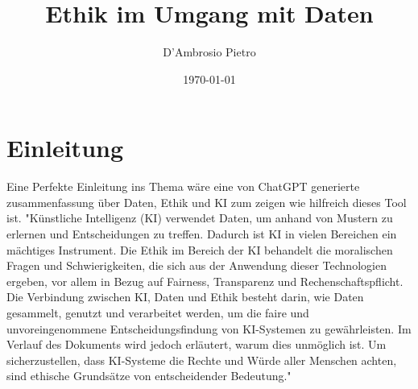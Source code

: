 \documentclass{report}
\title{Ethik im Umgang mit Daten}
\author{D'Ambrosio Pietro}
\date{\today}
\begin{document}
\maketitle


\tableofcontents
\newpage
\chapter{Einleitung}
Eine Perfekte Einleitung ins Thema wäre eine von ChatGPT generierte 
zusammenfassung über Daten, Ethik und KI zum zeigen wie hilfreich dieses Tool ist.
"Künstliche Intelligenz (KI) verwendet Daten, um anhand von Mustern zu 
erlernen und Entscheidungen zu treffen. Dadurch ist KI in vielen Bereichen 
ein mächtiges Instrument. Die Ethik im Bereich der KI behandelt die moralischen 
Fragen und Schwierigkeiten, die sich aus der Anwendung dieser Technologien ergeben, 
vor allem in Bezug auf Fairness, Transparenz und Rechenschaftspflicht. Die Verbindung 
zwischen KI, Daten und Ethik besteht darin, wie Daten gesammelt, genutzt und verarbeitet 
werden, um die faire und unvoreingenommene Entscheidungsfindung von KI-Systemen zu gewährleisten. 
Im Verlauf des Dokuments wird jedoch erläutert, warum dies unmöglich ist. Um sicherzustellen, 
dass KI-Systeme die Rechte und Würde aller Menschen achten, sind ethische Grundsätze von entscheidender 
Bedeutung."











\printbibliography
\end{document}
